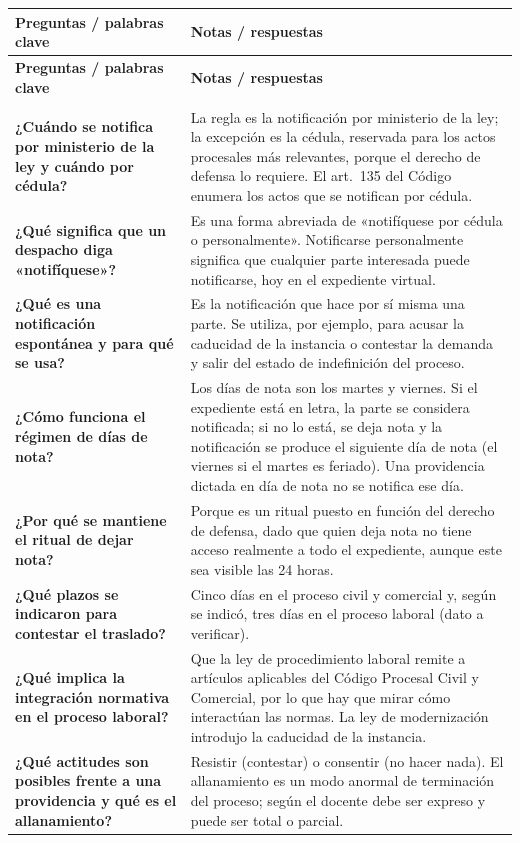 \documentclass[12pt,oneside]{book}
\newlength{\cornellizq}
\newlength{\cornellder}
\newenvironment{cornell}
{\begin{longtable}{>{\columncolor{gray!10}\raggedright\arraybackslash}p{\cornellizq}>{\raggedright\arraybackslash}p{\cornellder}}
\toprule
\textbf{Preguntas / palabras clave} & \textbf{Notas / respuestas} \\
\midrule
\endfirsthead
\toprule
\textbf{Preguntas / palabras clave} & \textbf{Notas / respuestas} \\
\midrule
\endhead
\midrule
\multicolumn{2}{r}{\footnotesize\itshape Continúa en la página siguiente} \\
\endfoot
\endlastfoot}
{\end{longtable}}
\begin{document}
\begin{cornell}
\textbf{¿Cuándo se notifica por ministerio de la ley y cuándo por cédula?} &
La regla es la notificación por ministerio de la ley; la excepción es la cédula, reservada para los actos procesales más relevantes, porque el derecho de defensa lo requiere. El art.~135 del Código enumera los actos que se notifican por cédula. \\
\addlinespace
\midrule[0.3pt]
\textbf{¿Qué significa que un despacho diga «notifíquese»?} &
Es una forma abreviada de «notifíquese por cédula o personalmente». Notificarse personalmente significa que cualquier parte interesada puede notificarse, hoy en el expediente virtual. \\
\addlinespace
\midrule[0.3pt]
\textbf{¿Qué es una notificación espontánea y para qué se usa?} &
Es la notificación que hace por sí misma una parte. Se utiliza, por ejemplo, para acusar la caducidad de la instancia o contestar la demanda y salir del estado de indefinición del proceso. \\
\addlinespace
\midrule[0.3pt]
\textbf{¿Cómo funciona el régimen de días de nota?} &
Los días de nota son los martes y viernes. Si el expediente está en letra, la parte se considera notificada; si no lo está, se deja nota y la notificación se produce el siguiente día de nota (el viernes si el martes es feriado). Una providencia dictada en día de nota no se notifica ese día. \\
\addlinespace
\midrule[0.3pt]
\textbf{¿Por qué se mantiene el ritual de dejar nota?} &
Porque es un ritual puesto en función del derecho de defensa, dado que quien deja nota no tiene acceso realmente a todo el expediente, aunque este sea visible las 24 horas. \\
\addlinespace
\midrule[0.3pt]
\textbf{¿Qué plazos se indicaron para contestar el traslado?} &
Cinco días en el proceso civil y comercial y, según se indicó, tres días en el proceso laboral (dato a verificar). \\
\addlinespace
\midrule[0.3pt]
\textbf{¿Qué implica la integración normativa en el proceso laboral?} &
Que la ley de procedimiento laboral remite a artículos aplicables del Código Procesal Civil y Comercial, por lo que hay que mirar cómo interactúan las normas. La ley de modernización introdujo la caducidad de la instancia. \\
\addlinespace
\midrule[0.3pt]
\textbf{¿Qué actitudes son posibles frente a una providencia y qué es el allanamiento?} &
Resistir (contestar) o consentir (no hacer nada). El allanamiento es un modo anormal de terminación del proceso; según el docente debe ser expreso y puede ser total o parcial. \\

\end{cornell}
\end{document}
